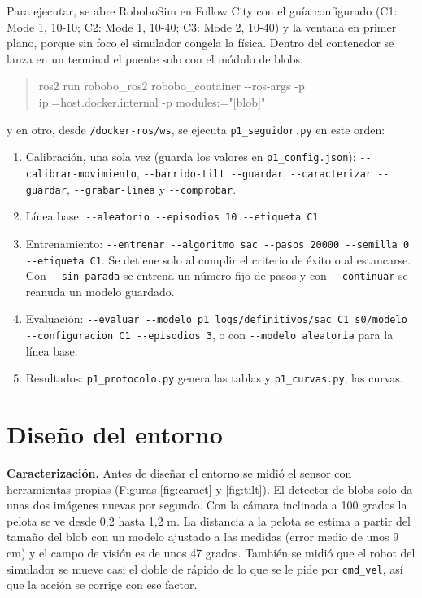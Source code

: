 \documentclass[11pt,a4paper]{article}
\newcommand{\cod}[1]{\texttt{\small #1}}
\begin{document}
Para ejecutar, se abre RoboboSim en Follow City con el guía configurado (C1: Mode 1, 10-10; C2: Mode 1, 10-40;
C3: Mode 2, 10-40) y la ventana en primer plano, porque sin foco el simulador congela la física. Dentro del
contenedor se lanza en un terminal el puente solo con el módulo de blobs:
\begin{quote}\small\ttfamily
ros2 run robobo\_ros2 robobo\_container -{}-ros-args -p ip:=host.docker.internal -p modules:="[\textquotesingle{}blob\textquotesingle{}]"
\end{quote}
y en otro, desde \cod{/docker-ros/ws}, se ejecuta \cod{p1\_seguidor.py} en este orden:
\begin{enumerate}
\item Calibración, una sola vez (guarda los valores en \cod{p1\_config.json}): \cod{-{}-calibrar-movimiento},
\cod{-{}-barrido-tilt -{}-guardar}, \cod{-{}-caracterizar -{}-guardar}, \cod{-{}-grabar-linea} y \cod{-{}-comprobar}.
\item Línea base: \cod{-{}-aleatorio -{}-episodios 10 -{}-etiqueta C1}.
\item Entrenamiento: \cod{-{}-entrenar -{}-algoritmo sac -{}-pasos 20000 -{}-semilla 0 -{}-etiqueta C1}. Se detiene solo al
cumplir el criterio de éxito o al estancarse. Con \cod{-{}-sin-parada} se entrena un número fijo de pasos y con
\cod{-{}-continuar} se reanuda un modelo guardado.
\item Evaluación: \cod{-{}-evaluar -{}-modelo p1\_logs/definitivos/sac\_C1\_s0/modelo -{}-configuracion C1 -{}-episodios 3},
o con \cod{-{}-modelo aleatoria} para la línea base.
\item Resultados: \cod{p1\_protocolo.py} genera las tablas y \cod{p1\_curvas.py}, las curvas.
\end{enumerate}

\section{Diseño del entorno}

\textbf{Caracterización.} Antes de diseñar el entorno se midió el sensor con herramientas propias (Figuras
\ref{fig:caract} y \ref{fig:tilt}). El detector de blobs solo da unas dos imágenes nuevas por segundo. Con la
cámara inclinada a 100 grados la pelota se ve desde 0,2 hasta 1,2 m. La distancia a la pelota se estima a partir
del tamaño del blob con un modelo ajustado a las medidas (error medio de unos 9 cm) y el campo de visión es de
unos 47 grados. También se midió que el robot del simulador se mueve casi el doble de rápido de lo que se le
pide por \cod{cmd\_vel}, así que la acción se corrige con ese factor.
\end{document}
